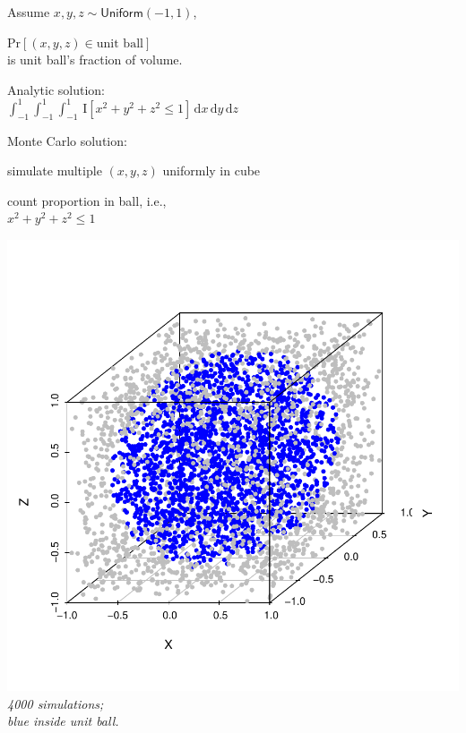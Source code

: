 \documentclass[10pt]{report}
\begin{document}
\noindent
\begin{minipage}[t]{0.6\textwidth}
\vspace*{-1.7in}
\begin{subitemize}
\item Assume $x, y, z \sim \mathsf{Uniform}(-1, 1)$,
\item $\mbox{Pr}[(x,y,z) \in \mbox{unit ball}]$ \hfill
\\ is unit ball's fraction of volume.
\item Analytic solution:
\\[4pt]\hspace*{-1em}
$\int_{-1}^1 \int_{-1}^1 \int_{-1}^1 \,
\mathrm{I}[ x^2 + y^2 + z^2 \leq 1 ] \,
\mathrm{d} x \, \mathrm{d} y \, \mathrm{d} z$

\item Monte Carlo solution:
\begin{subsubitemize}
\item simulate multiple $(x, y, z)$ uniformly in cube
\item count proportion in ball, i.e., \\[4pt]
$x^2 + y^2 + z^2 \leq 1$
\end{subsubitemize}
\end{subitemize}
\end{minipage}
\hfill
\begin{minipage}[t]{0.4\textwidth}
\includegraphics[width=1.2\textwidth]{img/ball-in-cube.pdf}
\\[-12pt]
{\footnotesize\slshape \hspace*{0.5in}4000 simulations;
\\\hspace*{0.5in}blue inside unit ball.}
\end{minipage}
\end{document}
